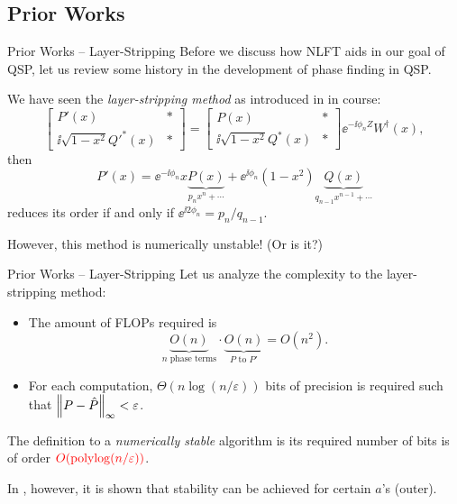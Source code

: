 \subsection{Prior Works}
\begin{frame}{Prior Works -- Layer-Stripping}
    Before we discuss how NLFT aids in our goal of QSP, let us review some history in the development of phase finding in QSP.

    We have seen the \textit{\color{blue}layer-stripping method} as introduced in \cite{GSLW18} in course:
    \begin{equation*}
        \left[\begin{matrix}
            P'(x) & * \\
            \ii\sqrt{1-x^2}Q'^*(x) & *
        \end{matrix}\right] = \left[\begin{matrix}
            P(x) & * \\
            \ii\sqrt{1-x^2}Q^*(x) & *
        \end{matrix}\right] \ee^{-\ii\phi_nZ} W^\dagger(x),
    \end{equation*}
    then
    \begin{equation*}
        P'(x) = \ee^{-\ii\phi_n}x\underbrace{P(x)}_{p_{n}x^{n}+\cdots} + \ee^{\ii\phi_n}(1-x^2)\underbrace{Q(x)}_{q_{n-1}x^{n-1}+\cdots}
    \end{equation*}
    reduces its order if and only if $\ee^{\ii2\phi_n} = p_{n} / q_{n-1}$.

    \color{red}However, this method is numerically unstable! \color{black}(Or is it?)
\end{frame}
\begin{frame}{Prior Works -- Layer-Stripping}
    Let us analyze the complexity to the layer-stripping method:
    \begin{itemize}
        \item The amount of FLOPs required is
        \begin{equation*}
            \underbrace{O(n)}_{n\text{ phase terms}} \cdot \underbrace{O(n)}_{P\text{ to }P'} = O(n^2).
        \end{equation*}
        \item For each computation, $\Theta(n \log(n/\varepsilon))$ bits of precision is required \cite{Haah_2019} such that $\left\lVert{P - \hat{P}}\right\rVert_\infty < \varepsilon$.
    \end{itemize}

    The definition to a \textit{numerically stable} algorithm is its required number of bits is of order $\color{red} O(\operatorname{\mathrm{polylog}}(n/\varepsilon))$.

    In \cite{Lin2025}, however, it is shown that stability can be achieved for certain $a$'s ({\color{red}outer}).
\end{frame}

